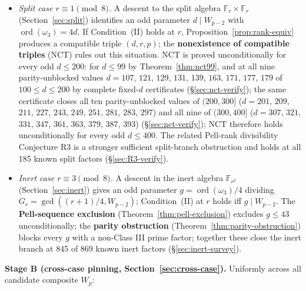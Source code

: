 \documentclass[11pt]{amsart}
\theoremstyle{plain}
\theoremstyle{definition}
\theoremstyle{remark}
\numberwithin{equation}{section}
\newcommand{\ord}{\operatorname{ord}}
\newcommand{\F}{\mathbb{F}}
\begin{document}
\begin{itemize}
\item \emph{Split case $r \equiv 1 \pmod 8$.} A descent to the split algebra $\F_r \times \F_r$ (Section~\ref{sec:split}) identifies an odd parameter $d \mid W_{p-2}$ with $\ord(\omega_3) = 4 d$. If Condition~(II) holds at $r$, Proposition~\ref{prop:rank-equiv} produces a compatible triple $(d,r,p)$; the \textbf{nonexistence of compatible triples} (NCT) rules out this situation. NCT is proved unconditionally for every odd $d \leq 200$: for $d \leq 99$ by Theorem~\ref{thm:nct99}, and at all nine parity-unblocked values $d = 107$, $121$, $129$, $131$, $139$, $163$, $171$, $177$, $179$ of $100 \leq d \leq 200$ by complete fixed-$d$ certificates (\S\ref{sec:nct-verify}); the same certificate closes all ten parity-unblocked values of $(200, 300]$ ($d = 201$, $209$, $211$, $227$, $243$, $249$, $251$, $281$, $283$, $297$) and all nine of $(300, 400]$ ($d = 307$, $321$, $331$, $347$, $361$, $363$, $379$, $387$, $393$) (\S\ref{sec:nct-verify}); NCT therefore holds unconditionally for every odd $d \leq 400$. The related Pell-rank divisibility Conjecture R3 is a stronger sufficient split-branch obstruction and holds at all 185 known split factors (\S\ref{sec:R3-verify}).
\item \emph{Inert case $r \equiv 3 \pmod 8$.} A descent in the inert algebra $\F_{r^2}$ (Section~\ref{sec:inert}) gives an odd parameter $g = \ord(\omega_3)/4$ dividing $G_r = \gcd((r+1)/4, W_{p-2})$; Condition~(II) at $r$ holds iff $g \mid W_{p-2}$. The \textbf{Pell-sequence exclusion} (Theorem~\ref{thm:pell-exclusion}) excludes $g \leq 43$ unconditionally; the \textbf{parity obstruction} (Theorem~\ref{thm:parity-obstruction}) blocks every $g$ with a non-Class III prime factor; together these close the inert branch at 845 of 869 known inert factors (\S\ref{sec:inert-survey}).
\end{itemize}

\textbf{Stage B (cross-case pinning, Section~\ref{sec:cross-case}).} Uniformly across all candidate composite $W_p$:
\end{document}
